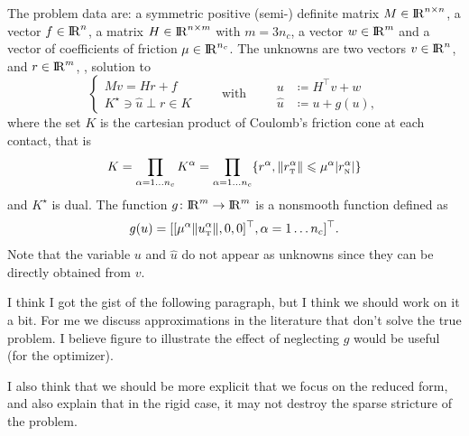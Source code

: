 The problem data are: a symmetric positive (semi-) definite matrix ${M} \in \mathrm{I\!R}^{n \times n}$, a vector $ {f} \in \mathrm{I\!R}^n$, a matrix  ${H} \in \mathrm{I\!R}^{n \times m}$ with $m= 3n_c$, a vector $w \in \mathrm{I\!R}^{m}$ and a vector of coefficients of friction $\mu \in \mathrm{I\!R}^{n_c}$.
The unknowns are two vectors $ {v} \in \mathrm{I\!R}^n$,  and $r\in \mathrm{I\!R}^m$, , solution to
\begin{equation}\label{eq:soccp1-intro}
 \begin{cases}
  M v = {H} {r} + {f}\\
  K^\star \ni {\hat u} \perp r \in K
 \end{cases}\qquad\text{with}\qquad
 \begin{aligned}
    u &\coloneqq H^\top v + w\\
    \hat u &\coloneqq u + g(u),
   \end{aligned}
\end{equation}
where the set $K$ is the cartesian product of Coulomb's friction cone at each contact, that is
\begin{equation}
  \label{eq:CC}
  K = \prod_{\alpha=1\ldots n_c} K^{\alpha}  = \prod_{\alpha=1\ldots n_c} \{r^\alpha, \|r^\alpha_\t \| \leq \mu^\alpha |r^\alpha_\n| \}
\end{equation}
and $K^\star$ is dual. The function $g\colon\mathrm{I\!R}^m\to\mathrm{I\!R}^m$ is a nonsmooth function defined as
\begin{equation}
g(u) = [[\mu^\alpha  \|u^\alpha_\t\|, 0, 0]^\top, \alpha = 1\ldots n_c]^\top\label{eq:gg}. 
\end{equation} Note that the variable $u$ and $\hat u$  do not appear as unknowns since they can be directly obtained from $v$.

\begin{ndroh}
I think I got the gist of the following paragraph, but I think we should work on it a bit. For me we discuss approximations in the literature that don't solve the true problem.
I believe  figure to illustrate the effect of neglecting $g$ would be useful (for the optimizer).

I also think that we should be more explicit that we focus on the reduced form, and also explain that in the rigid case, it may not destroy the sparse stricture of the problem.
\end{ndroh}

